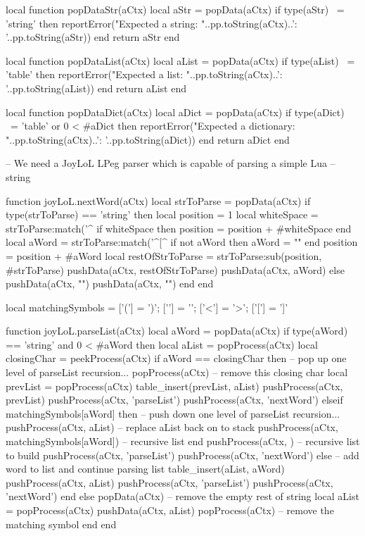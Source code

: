 local function popDataStr(aCtx)
  local aStr = popData(aCtx)
  if type(aStr) ~= 'string' then
    reportError("Expected a string\naCtx: "..pp.toString(aCtx)..'\naStr: '..pp.toString(aStr))
  end
  return aStr
end

local function popDataList(aCtx)
  local aList = popData(aCtx)
  if type(aList) ~= 'table' then
    reportError("Expected a list\naCtx: "..pp.toString(aCtx)..'\naList: '..pp.toString(aList))
  end
  return aList
end

local function popDataDict(aCtx)
  local aDict = popData(aCtx)
  if type(aDict) ~= 'table' or 0 < #aDict then
    reportError("Expected a dictionary\naCtx: "..pp.toString(aCtx)..'\naDict: '..pp.toString(aDict))
  end
  return aDict
end

-- We need a JoyLoL LPeg parser which is capable of parsing a simple Lua 
-- string 

function joyLoL.nextWord(aCtx)
  local strToParse = popData(aCtx)
  if type(strToParse) == 'string' then
    local position = 1
    local whiteSpace = strToParse:match('^%
    if whiteSpace then position = position + #whiteSpace end
    local aWord = strToParse:match('^[^%
    if not aWord then aWord = "" end
    position = position + #aWord
    local restOfStrToParse = strToParse:sub(position, #strToParse)
    pushData(aCtx, restOfStrToParse)
    pushData(aCtx, aWord)
  else
    pushData(aCtx, "")
    pushData(aCtx, "")
  end
end

local matchingSymbols = {
  ['('] = ')';
  ['{'] = '}';
  ['<'] = '>';
  ['['] = ']'
}

function joyLoL.parseList(aCtx)
  local aWord = popData(aCtx)
  if type(aWord) == 'string' and 0 < #aWord then
    local aList = popProcess(aCtx)
    local closingChar = peekProcess(aCtx)
    if aWord == closingChar then
      -- pop up one level of parseList recursion...
      popProcess(aCtx)       -- remove this closing char
      local prevList = popProcess(aCtx)
      table_insert(prevList, aList)
      pushProcess(aCtx, prevList)
      pushProcess(aCtx, 'parseList')
      pushProcess(aCtx, 'nextWord')
    elseif matchingSymbols[aWord] then
      -- push down one level of parseList recursion...
      pushProcess(aCtx, aList) -- replace aList back on to stack
      pushProcess(aCtx, matchingSymbols[aWord]) -- recursive list end
      pushProcess(aCtx, {})                     -- recursive list to build
      pushProcess(aCtx, 'parseList')
      pushProcess(aCtx, 'nextWord')
    else
      -- add word to list and continue parsing list
      table_insert(aList, aWord)
      pushProcess(aCtx, aList)
      pushProcess(aCtx, 'parseList')
      pushProcess(aCtx, 'nextWord')
    end
  else
    popData(aCtx) -- remove the empty rest of string
    local aList = popProcess(aCtx)
    pushData(aCtx, aList)
    popProcess(aCtx) -- remove the matching symbol
  end
end


